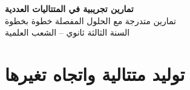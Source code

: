 \documentclass[12pt,a4paper]{article}
\newenvironment{LTR}{\begin{otherlanguage}{english}}{\end{otherlanguage}}
\begin{document}
\begin{LTR}
\begin{tcolorbox}[enhanced,colback=cSec,colframe=cSec,arc=3mm,halign=center,boxrule=0pt,top=12pt,bottom=12pt,before upper={\selectlanguage{arabic}}]
{\color{white}\fontsize{26}{32}\selectfont\bfseries تمارين تجريبية في المتتاليات العددية}\\[8pt]
{\color{white}\large تمارين متدرجة مع الحلول المفصلة خطوة بخطوة}\\[5pt]
{\color{white}\large السنة الثالثة ثانوي -- الشعب العلمية}
\end{tcolorbox}
\end{LTR}
\section{توليد متتالية واتجاه تغيرها}
\end{document}
